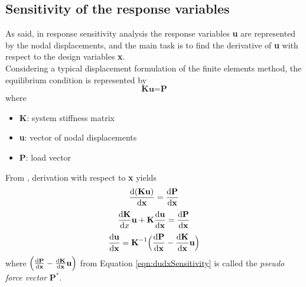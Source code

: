 \subsection{Sensitivity of the response variables}
As said, in response sensitivity analysis the response variables \textbf{u} are represented by the nodal displacements, and the main task is to find the derivative of \textbf{u} with respect to the design variables \textbf{x}.\\[3pt]
Considering a typical displacement formulation of the finite elements method, the equilibrium condition is represented by 
\begin{equation}
\textbf{K}\textbf{u} = \textbf{P}
\end{equation}
where 
\begin{itemize}
\item \textbf{K}: system stiffness matrix 
\item \textbf{u}: vector of nodal displacements
\item \textbf{P}: load vector
\end{itemize}
From \cite{optimization_Bletzinger}, derivation with respect to \textbf{x} yields 
\begin{equation}
\dv{(\textbf{K}\textbf{u})}{\textbf{x}} = \dv{\textbf{P}}{\textbf{x}}
\end{equation}
\begin{equation}
\dv{\textbf{K}}{x}\textbf{u} + \textbf{K} \dv{\textbf{u}}{\textbf{x}} = \dv{\textbf{P}}{\textbf{x}}
\end{equation}
\begin{equation} \label{eqn:dudxSensitivity}
\dv{\textbf{u}}{\textbf{x}} = \textbf{K}^{-1} \Big(\dv{\textbf{P}}{\textbf{x}} - \dv{\textbf{K}}{\textbf{x}} \textbf{u}\Big)
\end{equation}
where $\Big(\dv{\textbf{P}}{\textbf{x}} - \dv{\textbf{K}}{\textbf{x}} \textbf{u}\Big)$ from Equation \ref{eqn:dudxSensitivity} is called the \textit{pseudo force vector} $\textbf{P}^{\ast}$.

